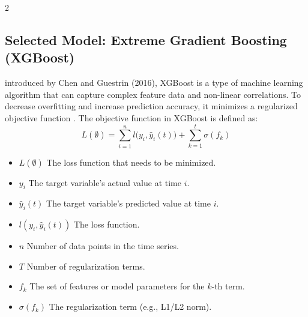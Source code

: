 \begin{multicols}{2}

  \subsection{Selected Model: Extreme Gradient Boosting (XGBoost)}
  introduced by Chen and Guestrin (2016), XGBoost is a type of machine learning algorithm that can capture complex feature data and non-linear correlations. To decrease overfitting and increase prediction accuracy, it minimizes a regularized objective function \cite{Chen2016XGBoostAS}. The objective function in XGBoost is defined as:
  {\setlength{\abovedisplayskip}{4pt}
    \setlength{\belowdisplayskip}{4pt}
    \setlength{\abovedisplayshortskip}{4pt}
    \setlength{\belowdisplayshortskip}{4pt}
  \begin{equation}
    L(\emptyset) = \sum_{i=1}^{n} l\big(y_i, \hat{y}_i(t)\big) + \sum_{k=1}^{t} \sigma(f_k)
  \end{equation}}
  \begin{itemize}
    \item{$L(\emptyset)$ The loss function that needs to be minimized.}
    \item{$y_i$ The target variable's actual value at time $i$.}
    \item{$\hat{y}_i(t)$ The target variable's predicted value at time $i$.}
    \item{$l(y_i, \hat{y}_i(t))$ The loss function.}
    \item{$n$ Number of data points in the time series.}
    \item{$T$ Number of regularization terms.}
    \item{$f_k$ The set of features or model parameters for the $k$-th term.}
    \item{$\sigma(f_k)$ The regularization term (e.g., L1/L2 norm).}
  \end{itemize}


\end{multicols}
